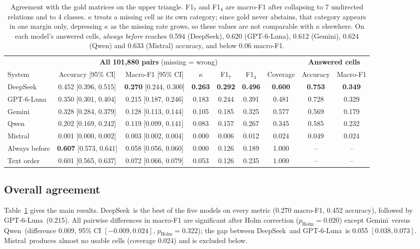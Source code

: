 \documentclass[11pt]{article}
\newcommand{\Ds}{DeepSeek}
\newcommand{\Gp}{GPT-6-Luna}
\newcommand{\Gm}{Gemini}
\newcommand{\Qw}{Qwen}
\newcommand{\Ms}{Mistral}
\begin{document}
\begin{table}[t]
\centering
\small
\setlength{\tabcolsep}{4.4pt}
\begin{tabular}{l cc ccc c cc}
\toprule
& \multicolumn{5}{c}{\textbf{All 101,880 pairs} (missing = wrong)} & & \multicolumn{2}{c}{\textbf{Answered cells}} \\
\cmidrule(lr){2-6}\cmidrule(lr){8-9}
System & Accuracy [95\% CI] & Macro-F1 [95\% CI] & $\kappa$ & F1$_{7}$ & F1$_{4}$ & Coverage & Accuracy & Macro-F1 \\
\midrule
\Ds & 0.452 [0.396, 0.515] & \textbf{0.270} [0.244, 0.300] & \textbf{0.263} & \textbf{0.292} & \textbf{0.496} & \textbf{0.600} & \textbf{0.753} & \textbf{0.349} \\
\Gp & 0.350 [0.301, 0.404] & 0.215 [0.187, 0.246] & 0.183 & 0.244 & 0.391 & 0.481 & 0.728 & 0.329 \\
\Gm & 0.328 [0.284, 0.379] & 0.128 [0.113, 0.144] & 0.105 & 0.185 & 0.325 & 0.577 & 0.569 & 0.179 \\
\Qw & 0.202 [0.169, 0.242] & 0.119 [0.099, 0.141] & 0.083 & 0.157 & 0.267 & 0.345 & 0.585 & 0.232 \\
\Ms & 0.001 [0.000, 0.002] & 0.003 [0.002, 0.004] & 0.000 & 0.006 & 0.012 & 0.024 & 0.049 & 0.024 \\
\midrule
Always before & \textbf{0.607} [0.573, 0.641] & 0.058 [0.056, 0.060] & 0.000 & 0.126 & 0.189 & 1.000 & -- & -- \\
Text order & 0.601 [0.565, 0.637] & 0.072 [0.066, 0.079] & 0.053 & 0.126 & 0.235 & 1.000 & -- & -- \\
\bottomrule
\end{tabular}
\caption{Agreement with the gold matrices on the upper triangle. F1$_7$ and F1$_4$ are macro-F1 after collapsing to 7 undirected relations and to 4 classes. $\kappa$ treats a missing cell as its own category; since gold never abstains, that category appears in one margin only, depressing $\kappa$ as the missing rate grows, so these values are not comparable with $\kappa$ elsewhere. On each model's answered cells, \emph{always before} reaches 0.594 (\Ds), 0.620 (\Gp), 0.612 (\Gm), 0.624 (\Qw) and 0.633 (\Ms) accuracy, and below 0.06 macro-F1.}
\label{tab:main}
\end{table}

\subsection{Overall agreement}
\label{sec:overall}

Table~\ref{tab:main} gives the main results. \Ds\ is the best of the five models on every metric (0.270 macro-F1, 0.452 accuracy), followed by \Gp\ (0.215). All pairwise differences in macro-F1 are significant after Holm correction ($p_{\mathrm{Holm}}=0.020$) except \Gm\ versus \Qw\ (difference 0.009, 95\% CI $[-0.009, 0.024]$, $p_{\mathrm{Holm}}=0.322$); the gap between \Ds\ and \Gp\ is 0.055 $[0.038, 0.073]$. \Ms\ produces almost no usable cells (coverage 0.024) and is excluded below.
\end{document}
